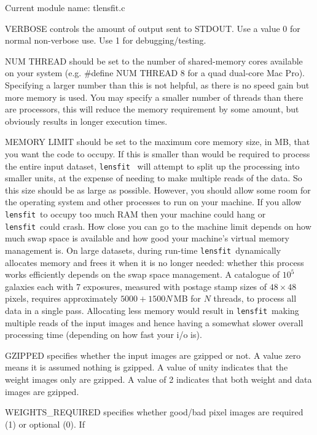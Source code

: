 \documentclass{article}
\def\lensfit{{\tt lensfit}\ }
\begin{document}
Current module name: tlensfit.c 

\begin{list}{}{\itemsep=0mm \leftmargin=5mm}
\item VERBOSE controls the amount of output sent to STDOUT.  Use a value 0 for normal non-verbose
use.  Use 1 for debugging/testing.
\item NUM THREAD should be set to the number of shared-memory cores available on your system (e.g. 
\#define NUM THREAD 8 for a quad dual-core Mac Pro). Specifying a larger number than this is not 
helpful, as there is no speed gain but more memory is used. You may specify a smaller number of threads 
than there are processors, this will reduce the memory requirement by some amount, but obviously results 
in longer execution times. 
\item MEMORY LIMIT should be set to the maximum core memory size, in MB, that you want the code 
to occupy. If this is smaller than would be required to process the entire input dataset, \lensfit 
will attempt to split up the processing into smaller units, at the expense of needing to make multiple reads 
of the data. So this size should be as large as possible. However, you should allow some room for the 
operating system and other processes to run on your machine. If you allow \lensfit to occupy too much 
RAM then your machine could hang or \lensfit could crash. How close you can go to the machine limit 
depends on how much swap space is available and how good your machine's virtual memory management 
is. On large datasets, during run-time \lensfit dynamically allocates memory and frees it when it is no 
longer needed: whether this process works efficiently depends on the swap space management. 
A catalogue of $10^5$ galaxies each with 7 exposures, measured with postage stamp sizes of $48 \times 48$ pixels,
requires approximately $5000 + 1500 N$\,MB for $N$ threads, to process all data in a single pass.  Allocating
less memory would result in \lensfit making multiple reads of the input images and hence having a somewhat slower
overall processing time (depending on how fast your i/o is).
\item GZIPPED specifies whether the input images are gzipped or not. A value zero means it is assumed 
nothing is gzipped. A value of unity indicates that the weight images only are gzipped. A value of 2 
indicates that both weight and data images are gzipped. 
\item WEIGHTS\_REQUIRED specifies whether good/bad pixel images are required (1) or optional (0). If 

\end{list}
\end{document}
